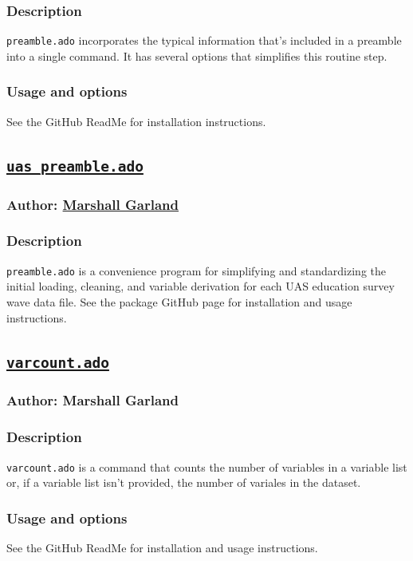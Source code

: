 {\subsubsection{Description}
\texttt{preamble.ado} incorporates the typical information that's included in a preamble into a single command. It has several options that simplifies this routine step.
\subsubsection{Usage and options}
See the GitHub ReadMe for installation instructions.

\subsection{\href{https://github.com/usc-care/uas_preamble}{\texttt{uas\_preamble.ado}}}
\subsubsection{Author: \href{mailto:garlandm@usc.edu}{Marshall Garland}}
\subsubsection{Description}
\texttt{preamble.ado} is a convenience program for simplifying and standardizing the initial loading, cleaning, and variable derivation for each UAS education survey wave data file. See the package GitHub page for installation and usage instructions.

\subsection{\href{https://github.com/marshallwg/varcount}{\texttt{varcount.ado}}}
\subsubsection{Author: Marshall Garland}
\subsubsection{Description}
\texttt{varcount.ado} is a command that counts the number of variables in a variable list or, if a variable list isn't provided, the number of variales in the dataset.
\subsubsection{Usage and options}
See the GitHub ReadMe for installation and usage instructions.

}

